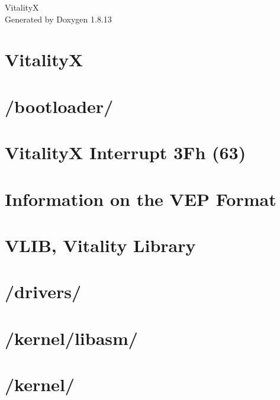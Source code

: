 \documentclass[twoside]{book}
\newcommand{\+}{\discretionary{\mbox{\scriptsize$\hookleftarrow$}}{}{}}
\newcommand{\clearemptydoublepage}{%
  \newpage{\pagestyle{empty}\cleardoublepage}%
}
\begin{document}
\hypersetup{pageanchor=false,
             bookmarksnumbered=true,
             pdfencoding=unicode
            }
\begin{titlepage}
\vspace*{7cm}
\begin{center}%
{\Large VitalityX }\\
\vspace*{1cm}
{\large Generated by Doxygen 1.8.13}\\
\end{center}
\end{titlepage}
\clearemptydoublepage
{}
\tableofcontents
\clearemptydoublepage
{}
\hypersetup{pageanchor=true}

\chapter{VitalityX}
\label{index}\hypertarget{index}{}
\chapter{/bootloader/}
\label{a00196}

\chapter{VitalityX Interrupt 3\+Fh (63)}
\label{a00197}

\chapter{Information on the V\+EP Format}
\label{a00198}

\chapter{V\+L\+IB, Vitality Library}
\label{a00199}

\chapter{/drivers/}
\label{a00200}

\chapter{/kernel/libasm/}
\label{a00201}

\chapter{/kernel/}
\label{a00202}

\end{document}
